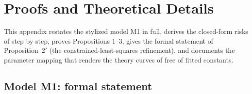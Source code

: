 \section{Proofs and Theoretical Details}\label{app:proofs}

This appendix restates the stylized model M1 in full, derives the closed-form risks of  step by step, proves Propositions 1--3, gives the formal statement of Proposition~2$'$ (the constrained-least-squares refinement), and documents the parameter mapping that renders the theory curves of  free of fitted constants.

\subsection{Model M1: formal statement}\label{app:proofs:m1}

